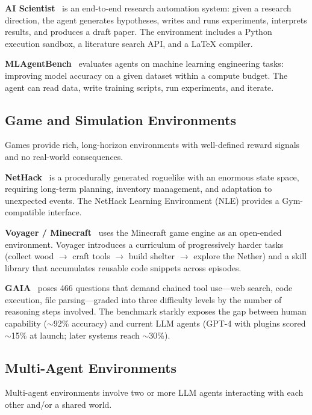 \textbf{AI Scientist}~\cite{lu2024aiscientist} is an end-to-end research automation system: given a research direction, the agent generates hypotheses, writes and runs experiments, interprets results, and produces a draft paper. The environment includes a Python execution sandbox, a literature search API, and a LaTeX compiler.

\textbf{MLAgentBench}~\cite{huang2024mlagentbench} evaluates agents on machine learning engineering tasks: improving model accuracy on a given dataset within a compute budget. The agent can read data, write training scripts, run experiments, and iterate.

\subsection{Game and Simulation Environments}
\label{game-and-simulation-environments}

Games provide rich, long-horizon environments with well-defined reward signals and no real-world consequences.

\textbf{NetHack}~\cite{kuttler2020nethack} is a procedurally generated roguelike with an enormous state space, requiring long-term planning, inventory management, and adaptation to unexpected events. The NetHack Learning Environment (NLE) provides a Gym-compatible interface.

\textbf{Voyager / Minecraft}~\cite{wang2023voyager} uses the Minecraft game engine as an open-ended environment. Voyager introduces a curriculum of progressively harder tasks (collect wood $\to$ craft tools $\to$ build shelter $\to$ explore the Nether) and a skill library that accumulates reusable code snippets across episodes.

\textbf{GAIA}~\cite{mialon2023gaia} poses 466 questions that demand chained tool use---web search, code execution, file parsing---graded into three difficulty levels by the number of reasoning steps involved. The benchmark starkly exposes the gap between human capability ($\sim$92\% accuracy) and current LLM agents (GPT-4 with plugins scored $\sim$15\% at launch; later systems reach $\sim$30\%).

\subsection{Multi-Agent Environments}
\label{multi-agent-environments}

Multi-agent environments involve two or more LLM agents interacting with each other and/or a shared world.

